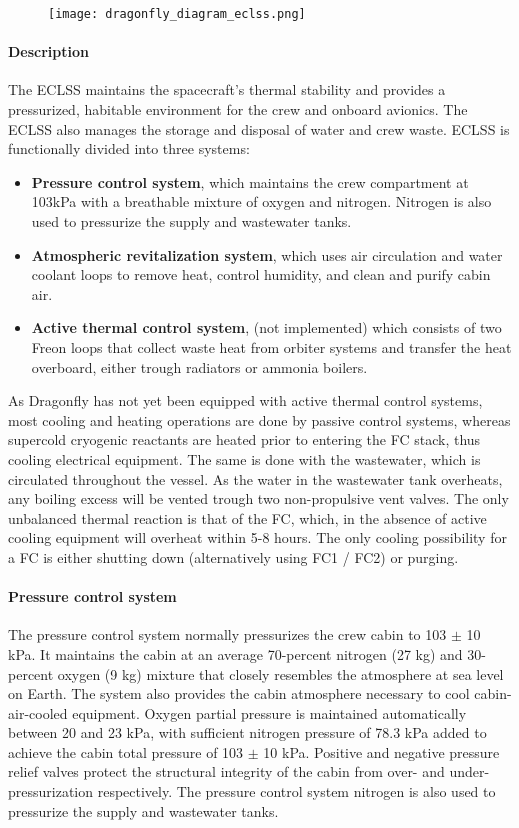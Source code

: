 \documentclass[Orbiter User Manual.tex]{subfiles}
\begin{document}
\begin{figure}[H]
  \centering
  \texttt{[image: dragonfly\_diagram\_eclss.png]}
\end{figure}

\paragraph{Description}
The ECLSS maintains the spacecraft's thermal stability and provides a pressurized, habitable environment for the crew and onboard avionics. The ECLSS also manages the storage and disposal of water and crew waste. ECLSS is functionally divided into three systems:

\begin{itemize}
\item \textbf{Pressure control system}, which maintains the crew compartment at 103kPa with a breathable mixture of oxygen and nitrogen. Nitrogen is also used to pressurize the supply and wastewater tanks.
\item \textbf{Atmospheric revitalization system}, which uses air circulation and water coolant loops to remove heat, control humidity, and clean and purify cabin air.
\item \textbf{Active thermal control system}, (not implemented) which consists of two Freon loops that collect waste heat from orbiter systems and transfer the heat overboard, either trough radiators or ammonia boilers.
\end{itemize}

\noindent
As Dragonfly has not yet been equipped with active thermal control systems, most cooling and heating operations are done by passive control systems, whereas supercold cryogenic reactants are heated prior to entering the FC stack, thus cooling electrical equipment. The same is done with the wastewater, which is circulated throughout the vessel. As the water in the wastewater tank overheats, any boiling excess will be vented trough two non-propulsive vent valves. The only unbalanced thermal reaction is that of the FC, which, in the absence of active cooling equipment will overheat within 5-8 hours. The only cooling possibility for a FC is either shutting down (alternatively using FC1 / FC2) or purging.

\paragraph{Pressure control system}
The pressure control system normally pressurizes the crew cabin to 103 $\pm$ 10 kPa. It maintains the cabin at an average 70-percent nitrogen (27 kg) and 30-percent oxygen (9 kg) mixture that closely resembles the atmosphere at sea level on Earth. The system also provides the cabin atmosphere necessary to cool cabin-air-cooled equipment. Oxygen partial pressure is maintained automatically between 20 and 23 kPa, with sufficient nitrogen pressure of 78.3 kPa added to achieve the cabin total pressure of 103 $\pm$ 10 kPa. Positive and negative pressure relief valves protect the structural integrity of the cabin from over- and under-pressurization respectively. The pressure control system nitrogen is also used to pressurize the supply and wastewater tanks.
\end{document}
